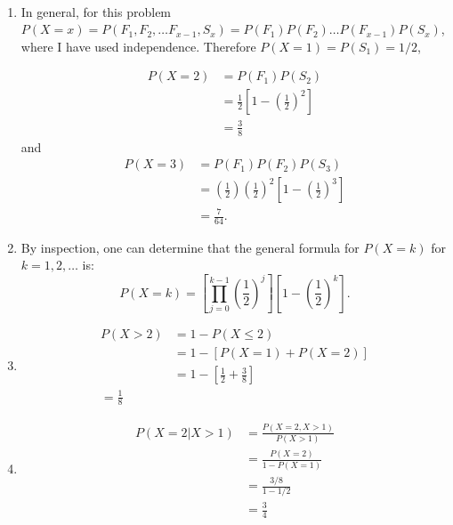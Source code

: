 \begin{problem}{8} $ $

\begin{enumerate}
\item In general, for this problem $P(X=x) = P(F_1, F_2,  \ldots F_{x-1}, S_x) = P(F_1) P(F_2)  \ldots P(F_{x-1})P(S_x)$, where I have used independence.  Therefore $P(X=1)=P(S_1)=1/2$,

\begin{align*}
P(X=2)& =P(F_1)P(S_2) \\
& = \frac{1}{2}\left[1-\left(\frac{1}{2}\right)^2\right] \\
&= \frac{3}{8}
\end{align*}
and
\begin{align*}
P(X=3)& =P(F_1)P(F_2)P(S_3) \\
& = \left(\frac{1}{2}\right) \left(\frac{1}{2}\right)^2 \left[1- \left(\frac{1}{2}\right)^3 \right] \\
&=\frac{7}{64}.
\end{align*}

\item By inspection, one can determine that the general formula for $P(X=k)$ for $k=1, 2, \ldots$ is:
\begin{equation*}
P(X=k) = \left [\prod_{j=0}^{k-1} \left(\frac{1}{2} \right)^j\right ] \left[1-\left( \frac{1}{2}\right)^k \right].
\end{equation*}

\item
\begin{align*}
P(X>2) &= 1 - P(X \le 2) \\
& =1-[P(X=1)+P(X=2)] \\
&=1-\left[\frac{1}{2}+\frac{3}{8}\right] \\
=\frac{1}{8}
\end{align*}
\item

\begin{align*}
P(X=2|X>1) &= \frac{P(X=2, X>1)}{P(X>1)} \\
& = \frac{P(X=2)}{1-P(X=1)} \\
& =\frac{3/8}{1-1/2} \\
& = \frac{3}{4}
\end{align*}



\end{enumerate}

\end{problem}

